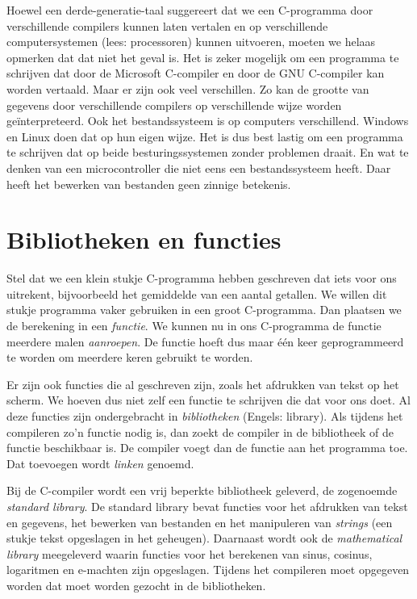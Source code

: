 Hoewel een derde-generatie-taal suggereert dat we een C-programma door verschillende compilers kunnen laten vertalen en op verschillende computersystemen (lees: processoren) kunnen uitvoeren, moeten we helaas opmerken dat dat niet het geval is. Het is zeker mogelijk om een programma te schrijven dat door de Microsoft C-compiler en door de GNU C-compiler kan worden vertaald. Maar er zijn ook veel verschillen. Zo kan de grootte van gegevens door verschillende compilers op verschillende wijze worden geïnterpreteerd. Ook het bestandssysteem is op computers verschillend. Windows en Linux doen dat op hun eigen wijze. Het is dus best lastig om een programma te schrijven dat op beide besturingssystemen zonder problemen draait. En wat te denken van een microcontroller die niet eens een bestandssysteem heeft. Daar heeft het bewerken van bestanden geen zinnige betekenis.


\section{Bibliotheken en functies}
Stel dat we een klein stukje C-programma hebben geschreven dat iets voor ons uitrekent, bijvoorbeeld het gemiddelde van een aantal getallen. We willen dit stukje programma vaker gebruiken in een groot C-programma. Dan plaatsen we de berekening in een \textsl{functie}. We kunnen nu in ons C-programma de functie meerdere malen \textsl{aanroepen}. De functie hoeft dus maar één keer geprogrammeerd te worden om meerdere keren gebruikt te worden.

Er zijn ook functies die al geschreven zijn, zoals het afdrukken van tekst op het scherm. We hoeven dus niet zelf een functie te schrijven die dat voor ons doet. Al deze functies zijn ondergebracht in \textsl{bibliotheken} (Engels: library). Als tijdens het compileren zo'n functie nodig is, dan zoekt de compiler in de bibliotheek of de functie beschikbaar is. De compiler voegt dan de functie aan het programma toe. Dat toevoegen wordt \textsl{linken} genoemd.

Bij de C-compiler wordt een vrij beperkte bibliotheek geleverd, de zogenoemde \textsl{standard library}. De standard library bevat functies voor het afdrukken van tekst en gegevens, het bewerken van bestanden en het manipuleren van \textsl{strings} (een stukje tekst opgeslagen in het geheugen). Daarnaast wordt ook de \textsl{mathematical library} meegeleverd waarin functies voor het berekenen van sinus, cosinus, logaritmen en e-machten zijn opgeslagen. Tijdens het compileren moet opgegeven worden dat moet worden gezocht in de bibliotheken.


